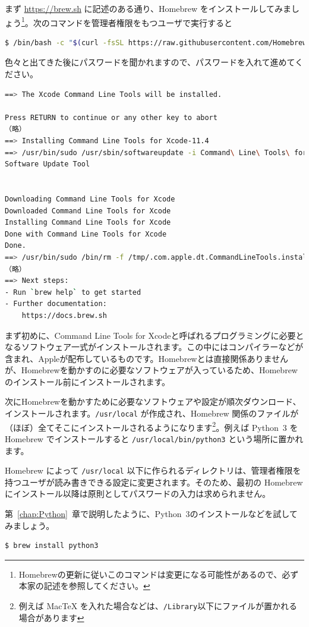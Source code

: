 まず \url{https://brew.sh} に記述のある通り、Homebrew をインストールしてみましょう\footnote{Homebrewの更新に従いこのコマンドは変更になる可能性があるので、必ず本家の記述を参照してください。}。次のコマンドを管理者権限をもつユーザで実行すると
\begin{lstlisting}[language=bash]
$ /bin/bash -c "$(curl -fsSL https://raw.githubusercontent.com/Homebrew/install/HEAD/install.sh)"
\end{lstlisting}
色々と出てきた後にパスワードを聞かれますので、パスワードを入れて進めてください。
\begin{lstlisting}[language=bash]
==> The Xcode Command Line Tools will be installed.

Press RETURN to continue or any other key to abort
（略）
==> Installing Command Line Tools for Xcode-11.4
==> /usr/bin/sudo /usr/sbin/softwareupdate -i Command\ Line\ Tools\ for\ Xcode-11.4
Software Update Tool


Downloading Command Line Tools for Xcode
Downloaded Command Line Tools for Xcode
Installing Command Line Tools for Xcode
Done with Command Line Tools for Xcode
Done.
==> /usr/bin/sudo /bin/rm -f /tmp/.com.apple.dt.CommandLineTools.installondemand.in-progress
（略）
==> Next steps:
- Run `brew help` to get started
- Further documentation: 
    https://docs.brew.sh
\end{lstlisting}
まず初めに、Command Line Tools for Xcodeと呼ばれるプログラミングに必要となるソフトウェア一式がインストールされます。この中にはコンパイラーなどが含まれ、Appleが配布しているものです。Homebrewとは直接関係ありませんが、Homebrewを動かすのに必要なソフトウェアが入っているため、Homebrewのインストール前にインストールされます。

次にHomebrewを動かすために必要なソフトウェアや設定が順次ダウンロード、インストールされます。\texttt{/usr/local} が作成され、Homebrew 関係のファイルが（ほぼ）全てそこにインストールされるようになります\footnote{例えば MacTeX を入れた場合などは、\texttt{/Library}以下にファイルが置かれる場合があります}。例えば Python~3 を Homebrew でインストールすると \texttt{/usr/local/bin/python3} という場所に置かれます。

Homebrew によって \texttt{/usr/local} 以下に作られるディレクトリは、管理者権限を持つユーザが読み書きできる設定に変更されます。そのため、最初の Homebrew にインストール以降は原則としてパスワードの入力は求められません。

第~\ref{chap:Python}~章で説明したように、Python~3のインストールなどを試してみましょう。

\begin{lstlisting}[language=bash]
$ brew install python3
\end{lstlisting}


